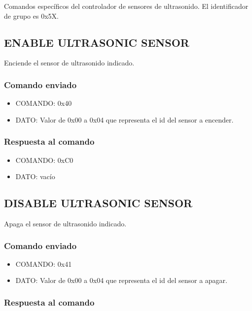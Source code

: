 \documentclass[a4paper,10pt]{article}
\begin{document}
Comandos espec\'ificos del controlador de sensores de ultrasonido.
El identificador de grupo es 0x5X.

\subsection{ENABLE ULTRASONIC SENSOR}
\label{enable_ultrasonic_sensor}

Enciende el sensor de ultrasonido indicado.

\subsubsection*{Comando enviado}

\begin{itemize}
	\item{COMANDO:} 0x40
	\item{DATO:} Valor de 0x00 a 0x04 que representa el id del sensor a encender.
\end{itemize}

\subsubsection*{Respuesta al comando}

\begin{itemize}
	\item{COMANDO:} 0xC0
	\item{DATO:} vac\'io
\end{itemize}

\subsection{DISABLE ULTRASONIC SENSOR}
\label{disable_ultrasonic_sensor}

Apaga el sensor de ultrasonido indicado.

\subsubsection*{Comando enviado}

\begin{itemize}
	\item{COMANDO:} 0x41
	\item{DATO:} Valor de 0x00 a 0x04 que representa el id del sensor a apagar.
\end{itemize}

\subsubsection*{Respuesta al comando}
\end{document}
